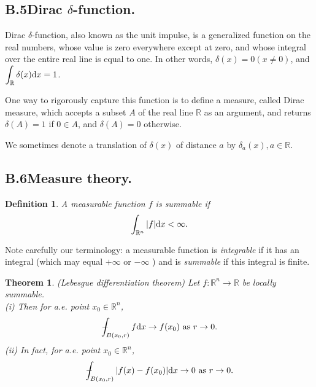 \documentclass[hyperref,UTF8,12pt]{article}
\numberwithin{equation}{subsection}
\theoremstyle{plain}
\newtheorem{theorem}{Theorem}
\newtheorem{definition}{Definition}
\theoremstyle{definition}
\numberwithin{theorem}{section}
\numberwithin{lemma}{section}
\numberwithin{proposition}{section}
\numberwithin{remark}{section}
\numberwithin{corollary}{section}
\numberwithin{definition}{section}
\numberwithin{problem}{section}
\numberwithin{example}{section}
\def\dif{\textup{d}}
\def\Xint#1{\mathchoice
	{\XXint\displaystyle\textstyle{#1}}%
	{\XXint\textstyle\scriptstyle{#1}}%
	{\XXint\scriptstyle\scriptscriptstyle{#1}}%
	{\XXint\scriptscriptstyle\scriptscriptstyle{#1}}%
	\!\int}
\def\XXint#1#2#3{{\setbox0=\hbox{$#1{#2#3}{\int}$ }
		\vcenter{\hbox{$#2#3$ }}\kern-.55\wd0}}
\def\dashint{\Xint-}
\newcommand{\dis}{\displaystyle}
\newcommand{\mr}{\mathbb{R}}
\begin{document}
\begin{appendices}
\subsection*{B.5\quad Dirac $\delta$-function.}\label{Dirac}
Dirac $\delta$-function, also known as the unit impulse, is a generalized function on the real numbers, whose value is zero everywhere except at zero, and whose integral over the entire real line is equal to one. In other words, $\delta(x)=0(x\neq0)$, and $\dis\int_\mr\delta(x)\dif x=1$.

One way to rigorously capture this function is to define a measure, called Dirac measure, which accepts a subset $A$ of the real line $\mr$ as an argument, and returns $\delta(A)=1$ if $0\in A$, and $\delta(A)=0$ otherwise.

We sometimes denote a translation of $\delta(x)$ of distance $a$ by $\delta_a(x),a\in\mr$.

\subsection*{B.6\quad Measure theory.}
\begin{definition}\label{summ}
A measurable function $f$ is \emph{summable} if\[\int_{\mr^n}|f|\dif x<\infty.\]
\end{definition}
Note carefully our terminology: a measurable function is \emph{integrable} if it has an integral (which may equal $+\infty$ or $-\infty$ ) and is \emph{summable} if this integral is finite.
\begin{theorem}\label{lebdt}
(Lebesgue differentiation theorem) Let $f:\mr^n\to\mr$ be locally summable.\\
\textup{(i)} Then for a.e. point $x_0\in\mr^n$,
\[\dashint_{B(x_0,r)}f\dif x\to f(x_0)~\text{as } r\to 0.\]
\textup{(ii)} In fact, for a.e. point $x_0\in\mr^n$,
\[\dashint_{B(x_0,r)}|f(x)-f(x_0)|\dif x\to 0~\text{as } r\to0.\]
\end{theorem}


\end{appendices}
\end{document}
